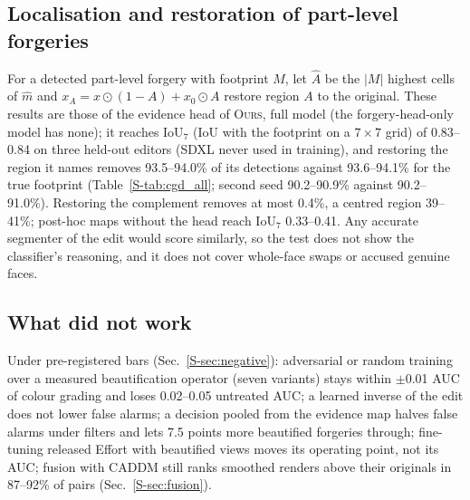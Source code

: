 \documentclass[conference]{IEEEtran}
\newcommand{\oursF}{\textsc{Ours}, full model}
\begin{document}
\subsection{Localisation and restoration of part-level forgeries}
\label{sec:cgd}
For a detected part-level forgery with footprint $M$, let $\hat A$ be the $|M|$ highest cells of $\hat m$ and
$x_A=x\odot(1-A)+x_0\odot A$ restore region $A$ to the original. These results are those of the evidence head of \oursF{} (the
forgery-head-only model has none); it reaches
IoU$_7$ (IoU with the footprint on a $7\times7$ grid) of 0.83--0.84 on three held-out editors (SDXL never used in training),
and restoring the region it names removes 93.5--94.0\% of its detections against 93.6--94.1\% for the true footprint
(Table~\ref{S-tab:cgd_all}; second seed 90.2--90.9\% against 90.2--91.0\%). Restoring the complement removes at most 0.4\%, a
centred region 39--41\%; post-hoc maps without the head reach IoU$_7$ 0.33--0.41. Any accurate segmenter of the edit would score
similarly, so the test does not show the classifier's reasoning, and it does not cover whole-face swaps or accused genuine faces.

\subsection{What did not work}
\label{sec:negative}
Under pre-registered bars (Sec.~\ref{S-sec:negative}): adversarial or random training over a measured beautification operator
(seven variants) stays within $\pm$0.01 AUC of colour grading and loses 0.02--0.05 untreated AUC; a learned inverse of the edit
does not lower false alarms; a decision pooled from the evidence map halves false alarms under filters and lets 7.5 points more
beautified forgeries through; fine-tuning released Effort with beautified views moves its operating point, not its AUC; fusion
with CADDM still ranks smoothed renders above their originals in 87--92\% of pairs (Sec.~\ref{S-sec:fusion}).

\end{document}
